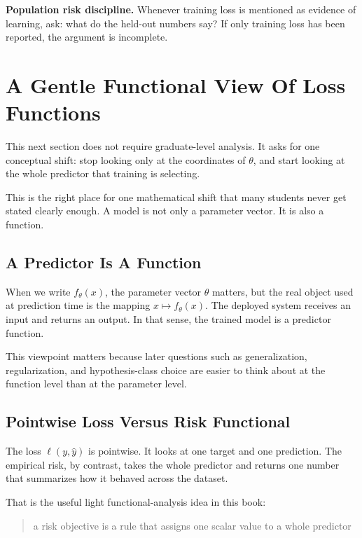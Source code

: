 \begin{thinkingtool}
\textbf{Population risk discipline.} Whenever training loss is mentioned as evidence of learning, ask: what do the held-out numbers say? If only training loss has been reported, the argument is incomplete.
\end{thinkingtool}

\section*{A Gentle Functional View Of Loss Functions}

This next section does not require graduate-level analysis. It asks for one conceptual shift: stop looking only at the coordinates of \(\theta\), and start looking at the whole predictor that training is selecting.

This is the right place for one mathematical shift that many students never get stated clearly enough. A model is not only a parameter vector. It is also a function.

\subsection*{A Predictor Is A Function}

When we write \(f_\theta(x)\), the parameter vector \(\theta\) matters, but the real object used at prediction time is the mapping \(x \mapsto f_\theta(x)\). The deployed system receives an input and returns an output. In that sense, the trained model is a predictor function.

This viewpoint matters because later questions such as generalization, regularization, and hypothesis-class choice are easier to think about at the function level than at the parameter level.

\subsection*{Pointwise Loss Versus Risk Functional}

The loss \(\ell(y, \hat{y})\) is pointwise. It looks at one target and one prediction. The empirical risk, by contrast, takes the whole predictor and returns one number that summarizes how it behaved across the dataset.

That is the useful light functional-analysis idea in this book:

\begin{quote}
a risk objective is a rule that assigns one scalar value to a whole predictor
\end{quote}

